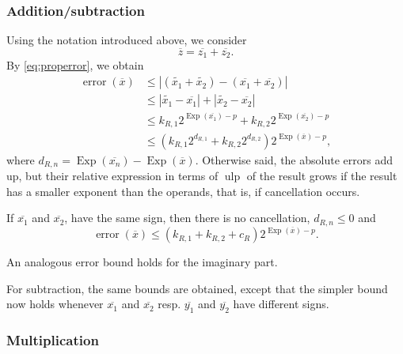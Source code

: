 \documentclass {article}
\newcommand {\corr}[1]{\widetilde {#1}}
\newcommand {\appro}[1]{\overline {#1}}
\newcommand {\Ulp}{{\operatorname {ulp}}}
\DeclareMathOperator{\Exp}{\operatorname {Exp}}
\newcommand{\error}{\operatorname {error}}
\renewcommand {\leq}{\leqslant}
\begin{document}
\subsubsection {Addition/subtraction}

Using the notation introduced above, we consider
\[
\appro z = \appro {z_1} + \appro {z_2}.
\]
By \eqref {eq:properror}, we obtain
\begin{align*}
\error (\appro x)
& \leq | (\corr {x_1} + \corr {x_2}) - (\appro {x_1} + \appro {x_2})|
\\
& \leq | \corr {x_1} - \appro {x_1} | + | \corr {x_2} - \appro {x_2}|
\\
& \leq k_{R,1} 2^{\Exp (\appro {x_1}) - p}
+ k_{R,2} 2^{\Exp (\appro {x_2}) - p}
\\
& \leq \left( k_{R,1} 2^{d_{R,1}} + k_{R,2} 2^{d_{R,2}} \right)
2^{\Exp (\appro x) - p},
\end{align*}
where $d_{R,n}=\Exp(\appro {x_n})-\Exp(\appro x)$.
Otherwise said, the absolute errors add up, but their relative expression
in terms of $\Ulp$ of the result grows if the result has a smaller
exponent than the operands, that is, if cancellation occurs.

If $\appro {x_1}$ and $\appro {x_2}$, have the same sign, then there
is no cancellation, $d_{R, n} \leq 0$ and
\[
\error (\appro x) \leq (k_{R,1} + k_{R,2} + c_R) 2^{\Exp (\appro x) - p}.
\]

An analogous error bound holds for the imaginary part.

For subtraction, the same bounds are obtained, except that the simpler bound
now holds whenever $\appro {x_1}$ and $\appro {x_2}$ resp.
$\appro {y_1}$ and $\appro {y_2}$ have different signs.


\subsubsection {Multiplication}
\label {sssec:propmul}
\end{document}

